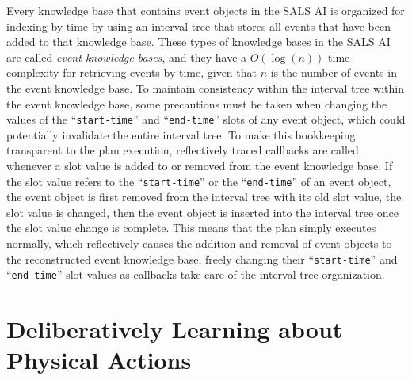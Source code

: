 Every knowledge base that contains event objects in the SALS AI is
organized for indexing by time by using an interval tree that stores
all events that have been added to that knowledge base.  These types
of knowledge bases in the SALS AI are called {\emph{event knowledge
    bases}}, and they have a $O(\log{(n)})$ time complexity for
retrieving events by time, given that $n$ is the number of events in
the event knowledge base.  To maintain consistency within the interval
tree within the event knowledge base, some precautions must be taken
when changing the values of the ``{\tt{start-time}}'' and
``{\tt{end-time}}'' slots of any event object, which could potentially
invalidate the entire interval tree.  To make this bookkeeping
transparent to the plan execution, reflectively traced callbacks are
called whenever a slot value is added to or removed from the event
knowledge base.  If the slot value refers to the ``{\tt{start-time}}''
or the ``{\tt{end-time}}'' of an event object, the event object is
first removed from the interval tree with its old slot value, the slot
value is changed, then the event object is inserted into the interval
tree once the slot value change is complete.  This means that the plan
simply executes normally, which reflectively causes the addition and
removal of event objects to the reconstructed event knowledge base,
freely changing their ``{\tt{start-time}}'' and ``{\tt{end-time}}''
slot values as callbacks take care of the interval tree organization.

\section{Deliberatively Learning about Physical Actions}

